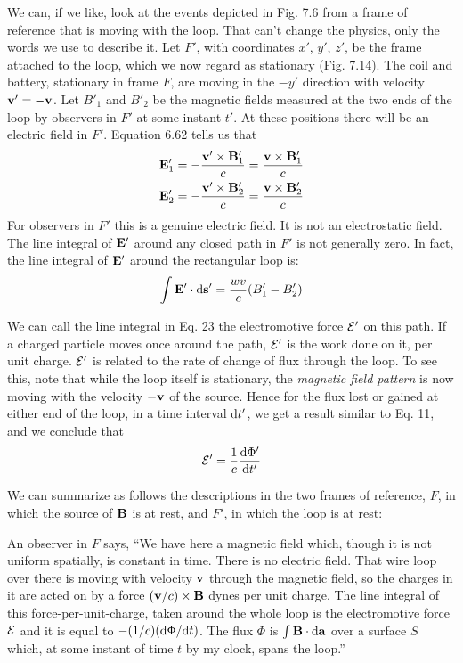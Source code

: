 We can, if we like, look at the events depicted in Fig. 7.6 from a
frame of reference that is moving with the loop. That can't change
the physics, only the words we use to describe it. Let $F'$, with coordinates
$x'$, $y'$, $z'$, be the frame attached to the loop, which we now regard
as stationary (Fig. 7.14). The coil and battery, stationary in frame $F$,
are moving in the $-y'$ direction with velocity $\mathbf{v}' = -\mathbf{v}$. Let $B'_1$ and
$B'_2$ be the magnetic fields measured at the two ends of the loop by
observers in $F'$ at some instant $t'$. At these positions there will be
an electric field in $F'$. Equation 6.62 tells us that
\begin{align}
\begin{split}
  \mathbf{E}'_1 &= -\frac{\mathbf{v'}\times\mathbf{B}_1'}{c} = \frac{\mathbf{v}\times\mathbf{B}'_1}{c} \\
  \mathbf{E}'_2 &= -\frac{\mathbf{v'}\times\mathbf{B}_2'}{c} = \frac{\mathbf{v}\times\mathbf{B}'_2}{c} 
\end{split}
\end{align}
For observers in $F'$ this is a genuine electric field. It is not an
electrostatic field. The line integral of $\mathbf{E}'$ around any closed path in
$F'$ is not generally zero. In fact, the line integral of $\mathbf{E}'$ around the
rectangular loop is:
\begin{equation}
  \int \mathbf{E}'\cdot\textup{d}\mathbf{s}' = \frac{wv}{c}(B'_1-B'_2)
\end{equation}

We can call the line integral in Eq. 23 the electromotive force $\mathcal{E}'$ on
this path. If a charged particle moves once around the path, $\mathcal{E}'$ is
the work done on it, per unit charge. $\mathcal{E}'$ is related to the rate of
change of flux through the loop. To see this, note that while the loop
itself is stationary, the \emph{magnetic field pattern} is now moving with the
velocity $-\mathbf{v}$ of the source. Hence for the flux lost or gained at either
end of the loop, in a time interval $\textup{d} t'$, we get a result similar to Eq. 11,
and we conclude that
\begin{equation}
  \mathcal{E}' = \frac{1}{c}\frac{\textup{d}\Phi'}{\textup{d} t'}
\end{equation}

We can summarize as follows the descriptions in the two frames of
reference, $F$, in which the source of $\mathbf{B}$ is at rest, and $F'$, in which the
loop is at rest:

An observer in $F$ says, ``We have here a magnetic field which,
though it is not uniform spatially, is constant in time. There is no
electric field. That wire loop over there is moving with velocity $\mathbf{v}$
through the magnetic field, so the charges in it are acted on by a force
$(\mathbf{v}/ c) \times \mathbf{B}$ dynes per unit charge. The line integral of this 
force-per-unit-charge, taken around the whole loop is the electromotive force $\mathcal{E}$
and it is equal to $-(1/c)(\textup{d}\Phi/\textup{d} t)$. The flux $\Phi$ is $\int\mathbf{B}\cdot\textup{d}\mathbf{a}$ over a surface
$S$ which, at some instant of time $t$ by my clock, spans the loop.''

